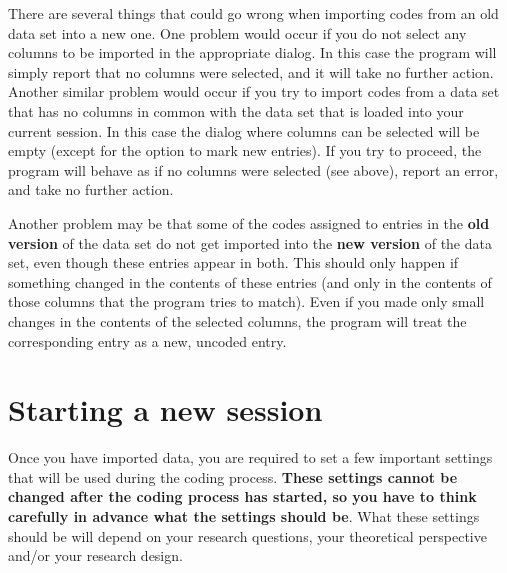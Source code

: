 \documentclass{memoir}
\begin{document}
There are several things that could go wrong when importing codes from an old data set into a new one. One problem would occur if you do not select any columns to be imported in the appropriate dialog. In this case the program will simply report that no columns were selected, and it will take no further action. Another similar problem would occur if you try to import codes from a data set that has no columns in common with the data set that is loaded into your current session. In this case the dialog where columns can be selected will be empty (except for the option to mark new entries). If you try to proceed, the program will behave as if no columns were selected (see above), report an error, and take no further action.

Another problem may be that some of the codes assigned to entries in the \textbf{old version} of the data set do not get imported into the \textbf{new version} of the data set, even though these entries appear in both. This should only happen if something changed in the contents of these entries (and only in the contents of those columns that the program tries to match). Even if you made only small changes in the contents of the selected columns, the program will treat the corresponding entry as a new, uncoded entry. 

\section{Starting a new session}
\label{sec:startinganewsession}

Once you have imported data, you are required to set a few important settings that will be used during the coding process. \textbf{These settings cannot be changed after the coding process has started, so you have to think carefully in advance what the settings should be}. What these settings should be will depend on your research questions, your theoretical perspective and/or your research design.
\end{document}
